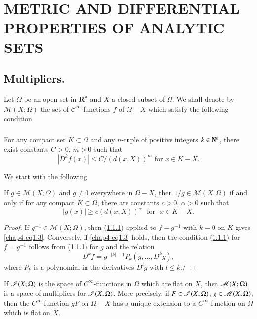 \chapter{METRIC AND DIFFERENTIAL PROPERTIES OF ANALYTIC SETS}\label{chap4}
\pageoriginale

\section[Multipliers]{Multipliers.}\label{chap4-sec1}

Let $\Omega$ be an open set in $\mathbf{R}^n$ and $X$ a closed subset of $\Omega$. We shall denote by $\mathscr{M}(X;\Omega)$ the set of $\mathcal{C}^\infty$-functions $f$ of $\Omega - X$ which satisfy the following condition


\subsection{}\label{chap4-sec1.1} For any compact set $K \subset \Omega$ and any $n$-tuple of positive integers $k \in \mathbf{N}^n$, there exist constants $C>0$, $m > 0$ such that
$$
|D^k f (x)| \leq C / (d (x, X))^m \text{ for } x \in K - X.
$$

We start with the following

\setcounter{theorem}{1}
\begin{lemma}\label{chap4-lem1.2}
  If $g \in \mathscr{M}(X ; \Omega)$ and $g \neq 0$ everywhere in $\Omega-X$, then $1/g \in \mathscr{M}(X ; \Omega)$ if and only if for any compact $K \subset \Omega$, there are constants $c>0$, $\alpha > 0$ such that
  \setcounter{equation}{2}
  \begin{equation}%
    |g(x)| \geq c (d (x, X))^\alpha \text{~ for ~} x \in K - X.\label{chap4-eq1.3}
  \end{equation}
\end{lemma}


\begin{proof}
  If $g^{-1} \in \mathscr{M} (X ; \Omega)$, then (\ref{chap4-sec1.1}) applied to $f = g^{-1}$  with $k=0$ on $K$ gives \eqref{chap4-eq1.3}. Conversely, if \eqref{chap4-eq1.3} holds, then the condition (\ref{chap4-sec1.1}) for $f = g^{-1}$ follows from (\ref{chap4-sec1.1}) for $g$ and the relation
  $$
D^k f = g^{-|k|-1} P_k (g, \ldots, D^k g),
$$
where $P_k$ is a polynomial in the derivatives $D^lg $ with $l \leq k$./
\end{proof}

\setcounter{theorem}{3}
\begin{proposition}\label{chap4-prop1.4}%
  If $\mathscr{I} (X ;\Omega)$ is the space of $C^{\infty}$-functions in $\Omega$ which are flat on $X$, then $\mathscr{M}(X;\Omega)$ is a space of multipliers for $\mathscr{I}(X;\Omega)$. More precisely, if $F \in \mathscr{I}(X;\Omega)$, $g \in \mathscr{M}(X;\Omega)$, then the $C^\infty$-function $gF$ on $\Omega- X$ has a unique extension to a $C^\infty$-function on $\Omega$ which is flat on $X$.
\end{proposition}


